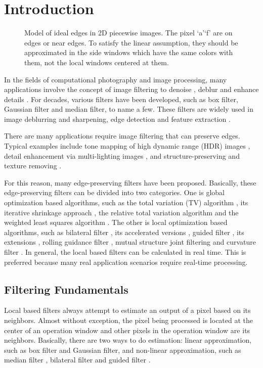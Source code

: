\documentclass[10pt,twocolumn,letterpaper]{article}
\begin{document}
\section{Introduction}
\begin{figure}[!tbh]
	\centering
	\caption{Model of ideal edges in 2D piecewise images. The pixel `a'`f' are on edges or near edges. To satisfy the linear assumption, they should be approximated in the side windows which have the same colors with them, not the local windows centered at them.}
	\label{edgeanalysis1}
\end{figure}
In the fields of computational photography and image processing, many applications involve the concept of image filtering to denoise \cite{denoise}, deblur \cite{deblur} and enhance details \cite{details}. For decades, various filters have been developed, such as box filter, Gaussian filter and median filter, to name a few. These filters are widely used in image deblurring and sharpening, edge detection and feature extraction \cite{book1}. 


There are many applications require image filtering that can preserve edges. Typical examples include tone mapping of high dynamic range (HDR) images \cite{hdr}, detail enhancement via multi-lighting images \cite{enhancement}, and structure-preserving and texture removing \cite{rtv}\cite{rgf}.

For this reason, many edge-preserving filters have been proposed. Basically, these edge-preserving filters can be divided into two categories. One is global optimization based algorithms, such as the total variation (TV) algorithm \cite{denoise}, its iterative shrinkage approach \cite{tv1}, the relative total variation  algorithm \cite{rtv} and the weighted least squares algorithm \cite{wls}. The other is local optimization based algorithms, such as bilateral filter \cite{bf}, its accelerated versions \cite{fbf}\cite{fbf1}\cite{fbf2}, guided filter \cite{gf}, its extensions \cite{wgf}\cite{ggf}, rolling guidance filter \cite{rgf}, mutual structure joint filtering \cite{msfjf} and curvature filter \cite{details}. In general, the local based filters can be calculated in real time. This is preferred because many real application scenarios require real-time processing. 

\subsection{Filtering Fundamentals}
Local based filters always attempt to estimate an output of a pixel based on its neighbors. Almost without exception, the pixel being processed is located at the center of an operation window and other pixels in the operation window are its neighbors. Basically, there are two ways to do estimation: linear approximation, such as box filter and Gaussian filter, and non-linear approximation, such as median filter \cite{mf}, bilateral filter \cite{bf} and guided filter \cite{gf}.  
\end{document}
